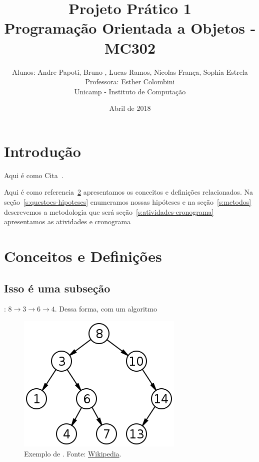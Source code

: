 \documentclass[a4paper,11pt,fleqn]{article}
\title{Projeto Prático 1\\
Programação Orientada a Objetos - MC302}
\author{Alunos: Andre Papoti, Bruno , Lucas Ramos, Nicolas França, Sophia Estrela\\
Professora: Esther Colombini\\
Unicamp - Instituto de Computação}
\date{Abril de 2018}
\begin{document}
\maketitle


\section{Introdução}



Aqui é como Cita~\cite{pfaff2004,pfaff2004full}.

Aqui é como referencia~\ref{s:conceitos} apresentamos os conceitos e definições
relacionados.  Na seção~\ref{s:questoes-hipoteses} enumeramos nossas
hipóteses e na seção~\ref{s:metodos} descrevemos a metodologia que será
seção~\ref{s:atividades-cronograma} apresentamos as atividades e cronograma


\section{Conceitos e Definições}
\label{s:conceitos}


\subsection{Isso é uma subseção}
\label{ss:bst}

: $8
\rightarrow 3 \rightarrow 6 \rightarrow 4$. Dessa forma, com um algoritmo


\begin{figure}[h!]
  \begin{center}
    \includegraphics[scale=0.5]{imagens/bst-example.png}
  \end{center}
  \caption{Exemplo de . Fonte:
    \href{https://en.wg}{Wikipedia}.}
  \label{f:bst}
\end{figure}
\end{document}
